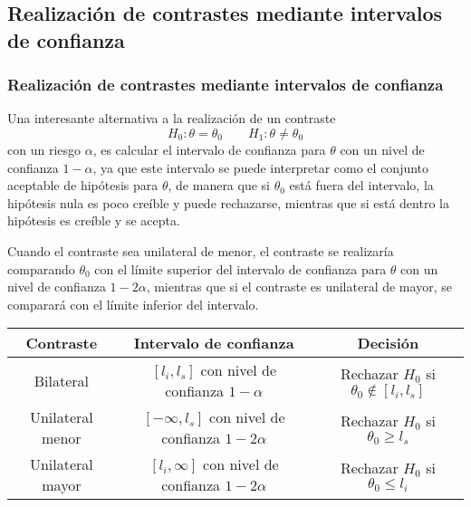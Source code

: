 \subsection{Realización de contrastes mediante intervalos de confianza}
\begin{frame}
\frametitle{Realización de contrastes mediante intervalos de confianza}
Una interesante alternativa a la realización de un contraste
\[
H_0: \theta=\theta_0\qquad
H_1: \theta\neq \theta_0
\]
con un riesgo $\alpha$, es calcular el intervalo de confianza para $\theta$ con un nivel de confianza $1-\alpha$, ya que este intervalo se puede interpretar como el conjunto aceptable de hipótesis para $\theta$, de manera que si $\theta_0$ está fuera del intervalo, la hipótesis nula es poco creíble y puede rechazarse, mientras que si está dentro la hipótesis es creíble y se acepta.

Cuando el contraste sea unilateral de menor, el contraste se realizaría comparando $\theta_0$ con el límite superior del intervalo de confianza para $\theta$ con un nivel de confianza $1-2\alpha$, mientras que si el contraste es unilateral de mayor, se comparará con el límite inferior del intervalo.
{\small
\begin{center}
\begin{tabular}{|c|c|c|}
\hline
Contraste & Intervalo de confianza & Decisión\\
\hline
Bilateral & $[l_i,l_s]$ con nivel de confianza $1-\alpha$ & Rechazar $H_0$ si $\theta_0\not \in [l_i,l_s]$\\
Unilateral menor & $[-\infty,l_s]$ con nivel de confianza $1-2\alpha$ & Rechazar $H_0$ si $\theta_0\geq l_s$\\
Unilateral mayor & $[l_i,\infty]$ con nivel de confianza $1-2\alpha$ & Rechazar $H_0$ si $\theta_0\leq l_i$\\
\hline
\end{tabular}
\end{center}
}
\end{frame}


